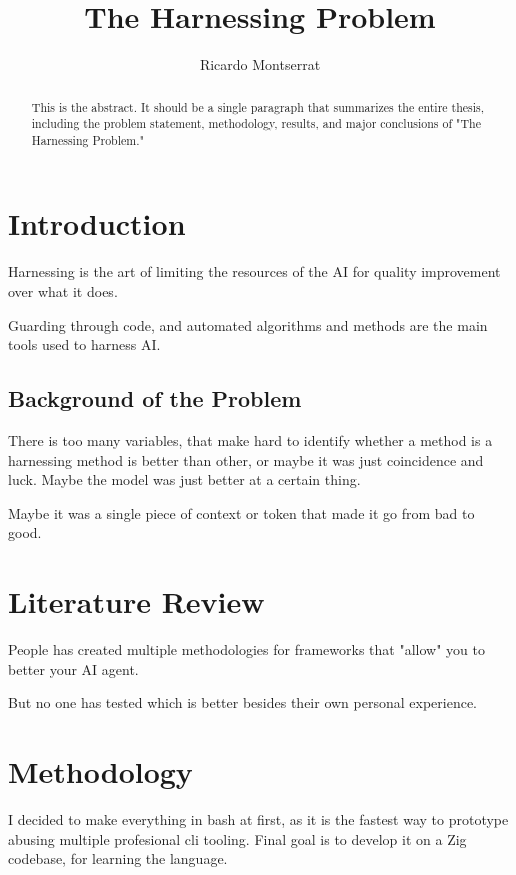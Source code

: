 \documentclass[12pt, a4paper, oneside]{report}
\title{The Harnessing Problem}
\author{Ricardo Montserrat}
\begin{document}
    \maketitle

	\begin{abstract}
	This is the abstract. It should be a single paragraph that summarizes the entire thesis, including the problem statement, methodology, results, and major conclusions of "The Harnessing Problem."
	\end{abstract}

	\tableofcontents
	\clearpage

	\chapter{Introduction}\label{ch:introduction}

    Harnessing is the art of limiting the resources of the AI for quality improvement over what it does.

	Guarding through code, and automated algorithms and methods are the main tools used to harness AI.

    \section{Background of the Problem}

    There is too many variables, that make hard to identify whether a method is a harnessing method is better than other,
	or maybe it was just coincidence and luck. Maybe the model was just better at a certain thing.

	Maybe it was a single piece of context or token that made it go from bad to good.

    \chapter{Literature Review}\label{ch:lit_review}

	People has created multiple methodologies for frameworks that "allow" you to better your AI agent.

	But no one has tested which is better besides their own personal experience.

    \chapter{Methodology}\label{ch:methodology}

	I decided to make everything in bash at first, as it is the fastest way to prototype abusing multiple
	profesional cli tooling. Final goal is to develop it on a Zig codebase, for learning the language.
\end{document}
